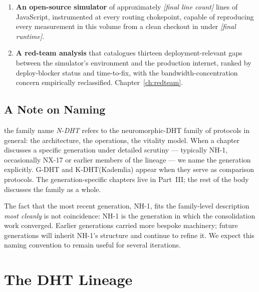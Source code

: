 \documentclass[twoside,nobib]{tufte-book}
\newcommand{\NDHT}{N-DHT\xspace}
\newcommand{\KDHT}{K-DHT\xspace}
\newcommand{\GDHT}{G-DHT\xspace}
\begin{document}
\begin{enumerate}
\item \textbf{An open-source simulator} of approximately
\textit{[final line count]} lines of JavaScript, instrumented at
every routing chokepoint, capable of reproducing every measurement
in this volume from a clean checkout in under \textit{[final
runtime]}.

\item \textbf{A red-team analysis} that catalogues thirteen
deployment-relevant gaps between the simulator's environment and
the production internet, ranked by deploy-blocker status and
time-to-fix, with the bandwidth-concentration concern
empirically reclassified.  Chapter~\ref{ch:redteam}.
\end{enumerate}

\section{A Note on Naming}

 the family name \emph{\NDHT}
refers to the neuromorphic-DHT family of protocols in general:
the architecture, the operations, the vitality model. When a chapter
discusses a specific generation under detailed scrutiny ---
typically NH-1, occasionally NX-17 or earlier members of the lineage
--- we name the generation explicitly. \GDHT and \KDHT (Kademlia)
appear when they serve as comparison protocols. The
generation-specific chapters live in Part~III; the rest of the body
discusses the family as a whole.

The fact that the most recent generation, NH-1, fits the family-level
description \emph{most cleanly} is not coincidence: NH-1 is the
generation in which the consolidation work converged. Earlier
generations carried more bespoke machinery; future generations will
inherit NH-1's structure and continue to refine it. We expect this
naming convention to remain useful for several iterations.


\chapter{The DHT Lineage}
\label{ch:lineage}
\end{document}
